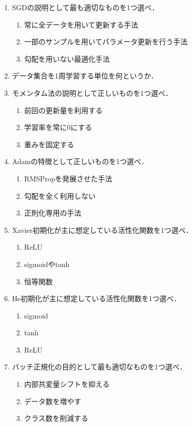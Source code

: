 \documentclass[uplatex,a4paper,12pt]{jsarticle}
\begin{document}
\begin{enumerate}

\item SGDの説明として最も適切なものを1つ選べ．
\begin{enumerate}[label=(\alph*)]
\item 常に全データを用いて更新する手法
\item 一部のサンプルを用いてパラメータ更新を行う手法
\item 勾配を用いない最適化手法
\end{enumerate}

\item データ集合を1周学習する単位を何というか．

\item モメンタム法の説明として正しいものを1つ選べ．
\begin{enumerate}[label=(\alph*)]
\item 前回の更新量を利用する
\item 学習率を常に0にする
\item 重みを固定する
\end{enumerate}

\item Adamの特徴として正しいものを1つ選べ．
\begin{enumerate}[label=(\alph*)]
\item RMSPropを発展させた手法
\item 勾配を全く利用しない
\item 正則化専用の手法
\end{enumerate}

\item Xavier初期化が主に想定している活性化関数を1つ選べ．
\begin{enumerate}[label=(\alph*)]
\item ReLU
\item sigmoidやtanh
\item 恒等関数
\end{enumerate}

\item He初期化が主に想定している活性化関数を1つ選べ．
\begin{enumerate}[label=(\alph*)]
\item sigmoid
\item tanh
\item ReLU
\end{enumerate}

\item バッチ正規化の目的として最も適切なものを1つ選べ．
\begin{enumerate}[label=(\alph*)]
\item 内部共変量シフトを抑える
\item データ数を増やす
\item クラス数を削減する
\end{enumerate}


\end{enumerate}
\end{document}
